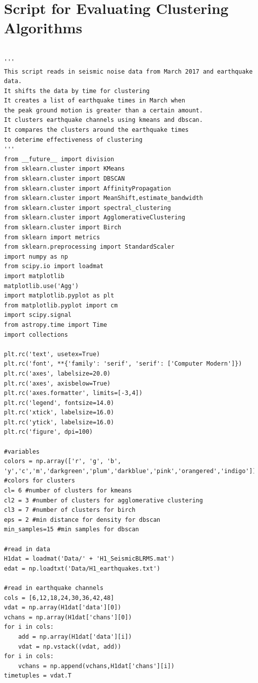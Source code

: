 \documentclass[colorlinks=true,pdfstartview=FitV,linkcolor=blue,
            citecolor=red,urlcolor=magenta]{ligodoc}
\begin{document}
\appendix
\section{Script for Evaluating Clustering Algorithms}
\begin{verbatim}   

'''
This script reads in seismic noise data from March 2017 and earthquake data.
It shifts the data by time for clustering
It creates a list of earthquake times in March when
the peak ground motion is greater than a certain amount. 
It clusters earthquake channels using kmeans and dbscan.
It compares the clusters around the earthquake times
to deterime effectiveness of clustering  
'''
from __future__ import division
from sklearn.cluster import KMeans
from sklearn.cluster import DBSCAN
from sklearn.cluster import AffinityPropagation
from sklearn.cluster import MeanShift,estimate_bandwidth
from sklearn.cluster import spectral_clustering
from sklearn.cluster import AgglomerativeClustering
from sklearn.cluster import Birch
from sklearn import metrics
from sklearn.preprocessing import StandardScaler
import numpy as np
from scipy.io import loadmat
import matplotlib
matplotlib.use('Agg')
import matplotlib.pyplot as plt
from matplotlib.pyplot import cm
import scipy.signal
from astropy.time import Time
import collections

plt.rc('text', usetex=True)
plt.rc('font', **{'family': 'serif', 'serif': ['Computer Modern']})
plt.rc('axes', labelsize=20.0)
plt.rc('axes', axisbelow=True)
plt.rc('axes.formatter', limits=[-3,4])
plt.rc('legend', fontsize=14.0)
plt.rc('xtick', labelsize=16.0)
plt.rc('ytick', labelsize=16.0)
plt.rc('figure', dpi=100)

#variables
colors = np.array(['r', 'g', 'b', 'y','c','m','darkgreen','plum','darkblue','pink','orangered','indigo']) #colors for clusters
cl= 6 #number of clusters for kmeans
cl2 = 3 #number of clusters for agglomerative clustering
cl3 = 7 #number of clusters for birch 
eps = 2 #min distance for density for dbscan
min_samples=15 #min samples for dbscan

#read in data
H1dat = loadmat('Data/' + 'H1_SeismicBLRMS.mat')
edat = np.loadtxt('Data/H1_earthquakes.txt')

#read in earthquake channels
cols = [6,12,18,24,30,36,42,48]
vdat = np.array(H1dat['data'][0])
vchans = np.array(H1dat['chans'][0])
for i in cols:
    add = np.array(H1dat['data'][i])
    vdat = np.vstack((vdat, add))
for i in cols:
    vchans = np.append(vchans,H1dat['chans'][i])
timetuples = vdat.T


\end{verbatim}
\end{document}
